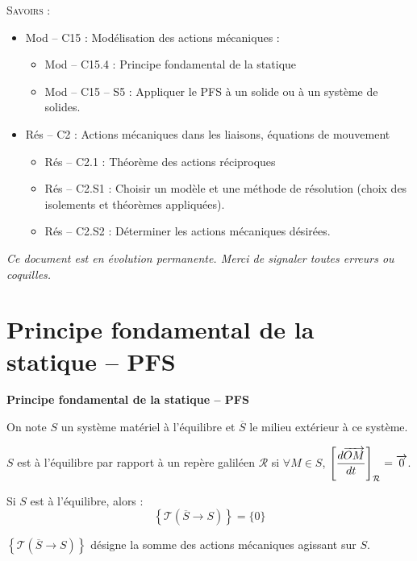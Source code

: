\documentclass[10pt]{article}
\begin{document}
\begin{savoir}
\textsc{Savoirs :}
\begin{itemize}
\item Mod -- C15 : Modélisation des actions mécaniques : 
\begin{itemize}
\item Mod -- C15.4 : Principe fondamental de la statique
\item Mod -- C15 -- S5  : Appliquer le PFS à un solide ou à un système de solides. 
\end{itemize}
\item Rés -- C2 : Actions mécaniques dans les liaisons, équations de mouvement
\begin{itemize}
\item Rés -- C2.1 : Théorème des actions réciproques
\item Rés -- C2.S1 : Choisir un modèle et une méthode de résolution (choix des isolements et théorèmes appliquées). 
\item Rés -- C2.S2 : Déterminer les actions mécaniques désirées.
\end{itemize}
\end{itemize}
\end{savoir}

\setlength{\parskip}{0ex plus 0.2ex minus 0ex}
 \renewcommand{\contentsname}{}
 \renewcommand{\baselinestretch}{1}

\tableofcontents

 \renewcommand{\baselinestretch}{1.2}
\setlength{\parskip}{2ex plus 0.5ex minus 0.2ex}

\textit{Ce document est en évolution permanente. Merci de signaler toutes
erreurs ou coquilles.}

\section{Principe fondamental de la statique -- PFS}
\begin{theo}
\textbf{Principe fondamental de la statique -- PFS}

On note $S$ un système matériel à l'équilibre et $\overline{S}$ le milieu extérieur à ce système.

$S$ est à l'équilibre par rapport à un repère galiléen $\mathcal{R}$ si $\forall M \in S$, $\left[\dfrac{d\overrightarrow{OM}}{dt}\right]_{\mathcal{R}}=\overrightarrow{0}$.

Si $S$ est à l'équilibre, alors : 
$$
\left\{ \mathcal{T} \left( \overline{S} \rightarrow  S\right)\right\} =\{0\}
$$

$\left\{ \mathcal{T}\left( \overline{S} \rightarrow  S\right)\right\}$ désigne la somme des actions mécaniques agissant sur $S$.
\end{theo}
\end{document}
